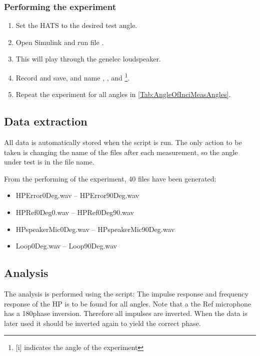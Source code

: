 \subsubsection{Performing the experiment}
\begin{enumerate}
	\item Set the HATS to the desired test angle. 
	\item Open Simulink and run file .
	\item This will play  through the genelec loudspeaker.
	\item Record and save, and name , ,  and \footnote{[i] indicates the angle of the experiment}.
	\item Repeat the experiment for all angles in \autoref{Tab:AngleOfInciMeasAngles}.
\end{enumerate}



\subsection{Data extraction}

All data is automatically stored when the script  is run. The only action to be taken is changing the name of the files after each measurement, so the angle under test is in the file name.


From the performing of the experiment, 40 files have been generated:
\begin{itemize}
	\item HPError0Deg.wav -- HPError90Deg.wav
	\item HPRef0Deg0.wav -- HPRef0Deg90.wav
	\item HPspeakerMic0Deg.wav -- 	HPspeakerMic90Deg.wav
	\item Loop0Deg.wav -- Loop90Deg.wav
\end{itemize}

\subsection{Analysis}
The analysis is performed using the script: 
The impulse response and frequency response of the HP is to be found for all angles.
Note that a the Ref microphone has a 180\textdegree phase inversion. Therefore all impulses are inverted. When the data is later used it should be inverted again to yield the correct phase. \cite{michandbook}

